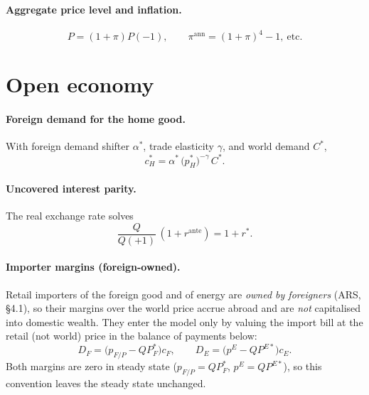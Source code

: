 \documentclass[11pt]{article}
\newcommand{\pE}{p^{E}}
\begin{document}
\paragraph{Aggregate price level and inflation.}
\begin{equation}
P=(1+\pi)P(-1),\qquad
\pi^{\text{ann}}=(1+\pi)^4-1,\ \text{etc.}
\end{equation}

\section{Open economy}\label{sec:open}

\paragraph{Foreign demand for the home good.} With foreign demand shifter
$\alpha^{*}$, trade elasticity $\gamma$, and world demand $C^{*}$,
\begin{equation}
c_H^{*}=\alpha^{*}\,\bigl(p_H^{*}\bigr)^{-\gamma}\,C^{*}.
\end{equation}

\paragraph{Uncovered interest parity.} The real exchange rate solves
\begin{equation}
\frac{Q}{Q(+1)}\,(1+r^{\text{ante}})=1+r^{*}. \label{eq:uip}
\end{equation}

\paragraph{Importer margins (foreign-owned).} Retail importers of the foreign
good and of energy are \emph{owned by foreigners} (ARS, \S4.1), so their margins
over the world price accrue abroad and are \emph{not} capitalised into domestic
wealth. They enter the model only by valuing the import bill at the retail (not
world) price in the balance of payments below:
\begin{equation}
D_F = \bigl(p_{F/P}-Q P^{*}_{F}\bigr)c_F,\qquad
D_E = \bigl(\pE-Q P^{E*}\bigr)c_E .
\end{equation}
Both margins are zero in steady state ($p_{F/P}=Q P^{*}_{F}$, $\pE=Q P^{E*}$), so
this convention leaves the steady state unchanged.
\end{document}
